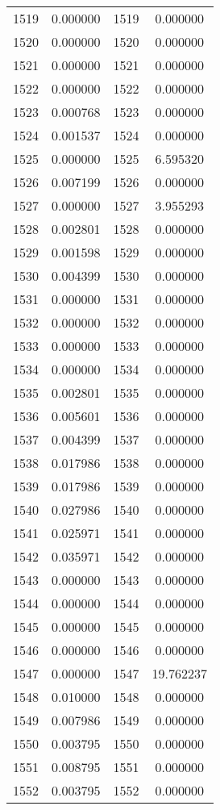 \documentclass[12pt]{article}
\begin{document}
\begin{longtable}{@{}cccc@{}}
1519 & 0.000000 & 1519 & 0.000000 \\
1520 & 0.000000 & 1520 & 0.000000 \\
1521 & 0.000000 & 1521 & 0.000000 \\
1522 & 0.000000 & 1522 & 0.000000 \\
1523 & 0.000768 & 1523 & 0.000000 \\
1524 & 0.001537 & 1524 & 0.000000 \\
1525 & 0.000000 & 1525 & 6.595320 \\
1526 & 0.007199 & 1526 & 0.000000 \\
1527 & 0.000000 & 1527 & 3.955293 \\
1528 & 0.002801 & 1528 & 0.000000 \\
1529 & 0.001598 & 1529 & 0.000000 \\
1530 & 0.004399 & 1530 & 0.000000 \\
1531 & 0.000000 & 1531 & 0.000000 \\
1532 & 0.000000 & 1532 & 0.000000 \\
1533 & 0.000000 & 1533 & 0.000000 \\
1534 & 0.000000 & 1534 & 0.000000 \\
1535 & 0.002801 & 1535 & 0.000000 \\
1536 & 0.005601 & 1536 & 0.000000 \\
1537 & 0.004399 & 1537 & 0.000000 \\
1538 & 0.017986 & 1538 & 0.000000 \\
1539 & 0.017986 & 1539 & 0.000000 \\
1540 & 0.027986 & 1540 & 0.000000 \\
1541 & 0.025971 & 1541 & 0.000000 \\
1542 & 0.035971 & 1542 & 0.000000 \\
1543 & 0.000000 & 1543 & 0.000000 \\
1544 & 0.000000 & 1544 & 0.000000 \\
1545 & 0.000000 & 1545 & 0.000000 \\
1546 & 0.000000 & 1546 & 0.000000 \\
1547 & 0.000000 & 1547 & 19.762237 \\
1548 & 0.010000 & 1548 & 0.000000 \\
1549 & 0.007986 & 1549 & 0.000000 \\
1550 & 0.003795 & 1550 & 0.000000 \\
1551 & 0.008795 & 1551 & 0.000000 \\
1552 & 0.003795 & 1552 & 0.000000 \\

\end{longtable}
\end{document}
